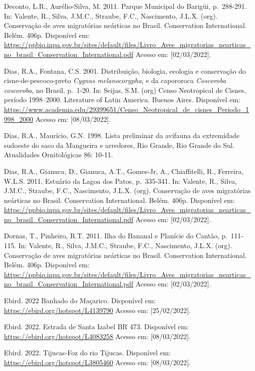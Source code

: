 \documentclass[
  oneside]{scrbook}
\begin{document}
Deconto, L.R., Aurélio-Silva, M. 2011. Parque Municipal do Barigüi, p.~288-291. In: Valente, R., Silva, J.M.C., Straube, F.C., Nascimento, J.L.X. (org). Conservação de aves migratórias neárticas no Brasil. Conservation International. Belém. 406p. Disponível em: \url{https://ppbio.inpa.gov.br/sites/default/files/Livro_Aves_migratorias_nearticas_no_brasil_Conservation_International.pdf} Acesso em: {[}02/03/2022{]}.

Dias, R.A., Fontana, C.S. 2001. Distribuição, biologia, ecologia e conservação do cisne-de-pescoco-preto \emph{Cygnus melanocorypha}, e da capororoca \emph{Coscoroba coscoroba}, no Brasil, p.~1-20. In: Seijas, S.M. (org) Censo Neotropical de Cisnes, período 1998--2000. Literature of Latin America. Buenos Aires. Disponível em: \url{https://www.academia.edu/29399651/Censo_Neotropical_de_cisnes_Periodo_1998_2000} Acesso em: {[}08/03/2022{]}.

Dias, R.A., Maurício, G.N. 1998. Lista preliminar da avifauna da extremidade sudoeste do saco da Mangueira e arredores, Rio Grande, Rio Grande do Sul. Atualidades Ornitológicas 86: 10-11.

Dias, R.A., Gianuca, D., Gianuca, A.T., Gomes-Jr, A., Chiaffitelli, R., Ferreira, W.L.S. 2011. Estuário da Lagoa dos Patos, p.~335-341. In: Valente, R., Silva, J.M.C., Straube, F.C., Nascimento, J.L.X. (org). Conservação de aves migratórias neárticas no Brasil. Conservation International. Belém. 406p. Disponível em: \url{https://ppbio.inpa.gov.br/sites/default/files/Livro_Aves_migratorias_nearticas_no_brasil_Conservation_International.pdf} Acesso em: {[}02/03/2022{]}.

Dornas, T., Pinheiro, R.T. 2011. Ilha do Bananal e Planície do Cantão, p.~111-115. In: Valente, R., Silva, J.M.C., Straube, F.C., Nascimento, J.L.X. (org). Conservação de aves migratórias neárticas no Brasil. Conservation International. Belém. 406p. Disponível em: \url{https://ppbio.inpa.gov.br/sites/default/files/Livro_Aves_migratorias_nearticas_no_brasil_Conservation_International.pdf} Acesso em: {[}02/03/2022{]}.

Ebird. 2022 Banhado do Maçarico. Disponível em: \url{https://ebird.org/hotspot/L4139790} Acesso em: {[}25/02/2022{]}.

Ebird. 2022. Estrada de Santa Izabel BR 473. Disponível em: \url{https://ebird.org/hotspot/L4083258} Acesso em: {[}08/03/2022{]}.

Ebird. 2022. Tijucas-Foz do rio Tijucas. Disponível em: \url{https://ebird.org/hotspot/L3805460} Acesso em: {[}08/03/2022{]}.
\end{document}
